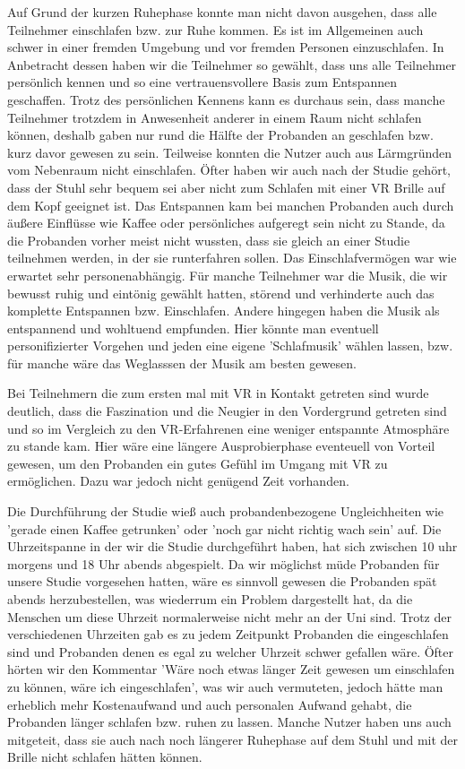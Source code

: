 Auf Grund der kurzen Ruhephase konnte man nicht davon ausgehen, dass alle Teilnehmer einschlafen bzw. zur Ruhe kommen. Es ist im Allgemeinen auch schwer in einer fremden Umgebung und vor fremden Personen einzuschlafen. In Anbetracht dessen haben wir die Teilnehmer so gewählt, dass uns alle Teilnehmer persönlich kennen und so eine vertrauensvollere Basis zum Entspannen geschaffen. Trotz des persönlichen Kennens kann es durchaus sein, dass manche Teilnehmer trotzdem in Anwesenheit anderer in einem Raum nicht schlafen können, deshalb gaben nur rund die Hälfte der Probanden an geschlafen bzw. kurz davor gewesen zu sein. Teilweise konnten die Nutzer auch aus Lärmgründen vom Nebenraum nicht einschlafen. Öfter haben wir auch nach der Studie gehört, dass der Stuhl sehr bequem sei aber nicht zum Schlafen mit einer VR Brille auf dem Kopf geeignet ist. Das Entspannen kam bei manchen Probanden auch durch äußere Einflüsse wie Kaffee oder persönliches aufgeregt sein nicht zu Stande, da die Probanden vorher meist nicht wussten, dass sie gleich an einer Studie teilnehmen werden, in der sie runterfahren sollen. Das Einschlafvermögen war wie erwartet sehr personenabhängig.
Für manche Teilnehmer war die Musik, die wir bewusst ruhig und eintönig gewählt hatten, störend und verhinderte auch das komplette Entspannen bzw. Einschlafen. Andere hingegen haben die Musik als entspannend und wohltuend empfunden. Hier könnte man eventuell personifizierter Vorgehen und jeden eine eigene 'Schlafmusik' wählen lassen, bzw. für manche wäre das Weglasssen der Musik am besten gewesen.

Bei Teilnehmern die zum ersten mal mit VR in Kontakt getreten sind wurde deutlich, dass die Faszination und die Neugier in den Vordergrund getreten sind und so im Vergleich zu den VR-Erfahrenen eine weniger entspannte Atmosphäre zu stande kam. Hier wäre eine längere Ausprobierphase eventeuell von Vorteil gewesen, um den Probanden ein gutes Gefühl im Umgang mit VR zu ermöglichen. Dazu war jedoch nicht genügend Zeit vorhanden.

Die Durchführung der Studie wieß auch probandenbezogene Ungleichheiten wie 'gerade einen Kaffee getrunken' oder 'noch gar nicht richtig wach sein' auf. Die Uhrzeitspanne in der wir die Studie durchgeführt haben, hat sich zwischen 10 uhr morgens und 18 Uhr abends abgespielt. Da wir möglichst müde Probanden für unsere Studie vorgesehen hatten, wäre es sinnvoll gewesen die Probanden spät abends herzubestellen, was wiederrum ein Problem dargestellt hat, da die Menschen um diese Uhrzeit normalerweise nicht mehr an der Uni sind. Trotz der verschiedenen Uhrzeiten gab es zu jedem Zeitpunkt Probanden die eingeschlafen sind und Probanden denen es egal zu welcher Uhrzeit schwer gefallen wäre.
Öfter hörten wir den Kommentar 'Wäre noch etwas länger Zeit gewesen um einschlafen zu können, wäre ich eingeschlafen', was wir auch  vermuteten, jedoch hätte man erheblich mehr Kostenaufwand und auch personalen Aufwand gehabt, die Probanden länger schlafen bzw. ruhen zu lassen. Manche Nutzer haben uns auch mitgeteit, dass sie auch nach noch längerer Ruhephase auf dem Stuhl und mit der Brille nicht schlafen hätten können. 


